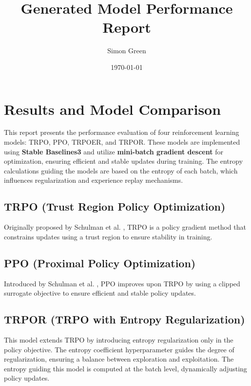 \documentclass{article}
\begin{document}
\title{Generated Model Performance Report}
\author{Simon Green}
\date{\today}
\maketitle

\section{Results and Model Comparison} 

This report presents the performance evaluation of four reinforcement learning models: TRPO, PPO, TRPOER, and TRPOR. These models are implemented using \textbf{Stable Baselines3} and utilize \textbf{mini-batch gradient descent} for optimization, ensuring efficient and stable updates during training. The entropy calculations guiding the models are based on the entropy of each batch, which influences regularization and experience replay mechanisms. 


\subsection{TRPO (Trust Region Policy Optimization)}

Originally proposed by Schulman et al. \cite{schulman2017trustregionpolicyoptimization}, TRPO is a policy gradient method that constrains updates using a trust region to ensure stability in training.

\subsection{PPO (Proximal Policy Optimization)}

Introduced by Schulman et al. \cite{schulman2017proximalpolicyoptimizationalgorithms}, PPO improves upon TRPO by using a clipped surrogate objective to ensure efficient and stable policy updates.

\subsection{TRPOR (TRPO with Entropy Regularization)}

This model extends TRPO by introducing entropy regularization only in the policy objective. The entropy coefficient hyperparameter guides the degree of regularization, ensuring a balance between exploration and exploitation. The entropy guiding this model is computed at the batch level, dynamically adjusting policy updates.
\end{document}
